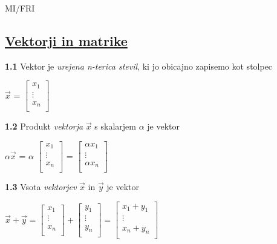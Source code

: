 \documentclass{article}
\begin{document}
\begin{center}
	{\small MI/FRI \par}
\end{center}

\begin{multicols}{2}

	\section{\underline{Vektorji in matrike}}

	\textbf{1.1} Vektor je \textit{urejena n-terica stevil}, ki jo obicajno
	zapisemo kot stolpec\smallskip
	\begin{center}
		$\vec{x}$ =
		$\begin{bmatrix}
				x_{1}  \\
				\vdots \\
				x_{n}  \\
			\end{bmatrix}$
	\end{center}

	\textbf{1.2} Produkt \textit{vektorja} $\vec{x}$ s skalarjem $\alpha$ je vektor
	\begin{center}
		$\alpha \vec{x}$ =
		$\alpha$
		$\begin{bmatrix}
				x_{1}  \\
				\vdots \\
				x_{n}  \\
			\end{bmatrix}$ =
		$\begin{bmatrix}
				\alpha x_{1} \\
				\vdots       \\
				\alpha x_{n} \\
			\end{bmatrix}$
	\end{center}

	\textbf{1.3} Vsota \textit{vektorjev} $\vec{x}$ in $\vec{y}$ je vektor
	\begin{center}
		$\vec{x} + \vec{y} =
			\begin{bmatrix}
				x_{1}  \\
				\vdots \\
				x_{n}  \\
			\end{bmatrix} +
			\begin{bmatrix}
				y_{1}  \\
				\vdots \\
				y_{n}  \\
			\end{bmatrix} =
			\begin{bmatrix}
				x_{1}  +  y_{1} \\
				\vdots          \\
				x_{n} + y_{n}   \\
			\end{bmatrix}
		$
	\end{center}


\end{multicols}
\end{document}
